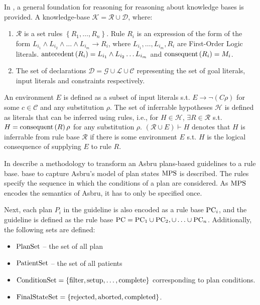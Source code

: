 In \cite{PreeceJIS94}, a general foundation for reasoning for reasoning
about knowledge bases is provided. A knowledge-base $\mathcal{K} = \mathcal{R}
\cup \mathcal{D}$, where:
\begin{enumerate}
  \item $\mathcal{R}$ is a set rules $\left\{R_1, \dots, R_n\right\}$.
    Rule $R_i$ is an expression of the form of the form
    $L_{i_1} \wedge L_{i_2} \wedge \dots \wedge L_{i_m} \rightarrow R_i$,
    where $L_{i_1}, \dots, L_{i_m}, R_i$ are First-Order Logic literals.
    $\text{antecedent}\left(R_i\right) = L_{i_1} \wedge L_{i_2} \dots L_{i_m}$ and $\text{consequent}\left(R_i\right) = M_i$.
  \item The set of declarations $\mathcal{D} = \mathcal{G} \cup \mathcal{L} \cup
    \mathcal{C}$ representing the set of goal literals, input literals and
    constraints respectively.
\end{enumerate}
An environment $E$ is defined as a subset of input literals s.t. $E \to
\neg(C\rho)$ for some $c \in \mathcal{C}$ and any substitution $\rho$.
The set of inferrable hypotheses $\mathcal{H}$ is defined as literals
that can be inferred using rules, i.e., for $H \in \mathcal{H}$,
$\exists R \in \mathcal{R}$ s.t. $H = \text{consequent}\left(R\right)\rho$ for any
substitution $\rho$. $\left(\mathcal{R} \cup E \right) \vdash H$
denotes that $H$ is inferrable from rule base $\mathcal{R}$ if there
is some environment $E$ s.t. $H$ is the logical consequence of supplying
$E$ to rule $R$.

In \cite{DuftschmidAIM01} describe a methodology to transform
an Asbru plans-based guidelines to a rule base.
base to capture Asbru's model of plan states $\text{MPS}{}$ is described.
The rules specify the sequence in which the conditions of a plan
are considered. As $\text{MPS}$ encodes the semantics of Asbru, it has
to only be specified once.

Next, each plan $P_i$ in the guideline is also encoded as a rule base
$\text{PC}_i$, and the guideline is defined as the rule base $\text{PC} = \text{PC}_1 \cup \text{PC}_2,
\cup \dots \cup \text{PC}_n$. Additionally, the following sets are defined:
\begin{itemize}
  \item $\text{PlanSet}$ -- the set of all plan
  \item $\text{PatientSet}$ -- the set of all patients
  \item $\text{ConditionSet} = \left\{\text{filter}, \text{setup}, \dots,
    \text{complete}\right\}$ corresponding to plan conditions.
  \item $\text{FinalStateSet} = \left\{\text{rejected}, \text{aborted}, \text{completed}\right\}$.
\end{itemize}

